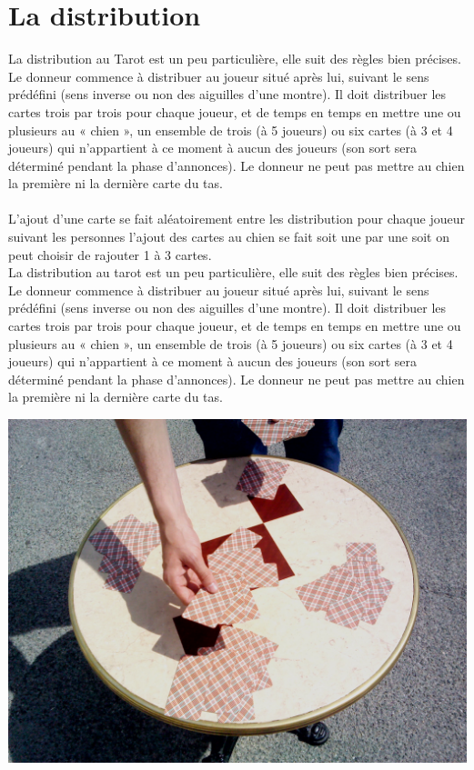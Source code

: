 \documentclass[a4paper]{report}
\begin{document}
	\section{La distribution}


		La distribution au Tarot est un peu particulière, elle suit des règles bien précises. Le donneur commence à distribuer au joueur situé après lui, suivant le sens prédéfini (sens 			inverse ou non des aiguilles d’une montre). Il doit distribuer les cartes trois par trois pour chaque joueur, et de temps en temps en mettre une ou plusieurs au « chien », un 			ensemble de trois (à 5 joueurs) ou six cartes (à 3 et 4 joueurs) qui n’appartient à ce moment à aucun des joueurs (son sort sera déterminé pendant la phase d’annonces). Le 			donneur ne peut pas mettre au chien la première ni la dernière carte du tas.\\
		\\ 
		L’ajout d’une carte se fait aléatoirement entre les distribution pour chaque joueur suivant les personnes l’ajout des cartes au chien se fait soit une par une soit on peut 			choisir de rajouter 1 à 3 cartes.\\
			La distribution au tarot est un peu particulière, elle suit des règles bien précises. Le donneur commence à distribuer au joueur situé après lui, suivant le sens prédéfini (sens 			inverse ou non des aiguilles d’une montre). Il doit distribuer les cartes trois par trois pour chaque joueur, et de temps en temps en mettre une ou plusieurs au « chien », un 			ensemble de trois (à 5 joueurs) ou six cartes (à 3 et 4 joueurs) qui n’appartient à ce moment à aucun des joueurs (son sort sera déterminé pendant la phase d’annonces). Le 			donneur ne peut pas mettre au chien la première ni la dernière carte du tas.\\
			\begin{center}
				\includegraphics[scale=0.15]{Images/3.jpg}
			\end{center}
\end{document}

